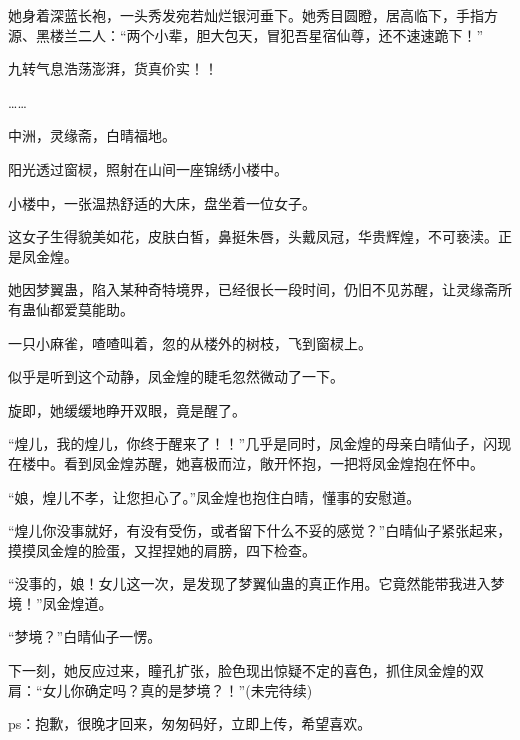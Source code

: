 \begin{this_body}
她身着深蓝长袍，一头秀发宛若灿烂银河垂下。她秀目圆瞪，居高临下，手指方源、黑楼兰二人：“两个小辈，胆大包天，冒犯吾星宿仙尊，还不速速跪下！”

九转气息浩荡澎湃，货真价实！！

……

中洲，灵缘斋，白晴福地。

阳光透过窗棂，照射在山间一座锦绣小楼中。

小楼中，一张温热舒适的大床，盘坐着一位女子。

这女子生得貌美如花，皮肤白皙，鼻挺朱唇，头戴凤冠，华贵辉煌，不可亵渎。正是凤金煌。

她因梦翼蛊，陷入某种奇特境界，已经很长一段时间，仍旧不见苏醒，让灵缘斋所有蛊仙都爱莫能助。

一只小麻雀，喳喳叫着，忽的从楼外的树枝，飞到窗棂上。

似乎是听到这个动静，凤金煌的睫毛忽然微动了一下。

旋即，她缓缓地睁开双眼，竟是醒了。

“煌儿，我的煌儿，你终于醒来了！！”几乎是同时，凤金煌的母亲白晴仙子，闪现在楼中。看到凤金煌苏醒，她喜极而泣，敞开怀抱，一把将凤金煌抱在怀中。

“娘，煌儿不孝，让您担心了。”凤金煌也抱住白晴，懂事的安慰道。

“煌儿你没事就好，有没有受伤，或者留下什么不妥的感觉？”白晴仙子紧张起来，摸摸凤金煌的脸蛋，又捏捏她的肩膀，四下检查。

“没事的，娘！女儿这一次，是发现了梦翼仙蛊的真正作用。它竟然能带我进入梦境！”凤金煌道。

“梦境？”白晴仙子一愣。

下一刻，她反应过来，瞳孔扩张，脸色现出惊疑不定的喜色，抓住凤金煌的双肩：“女儿你确定吗？真的是梦境？！”(未完待续)

ps：抱歉，很晚才回来，匆匆码好，立即上传，希望喜欢。

\end{this_body}

